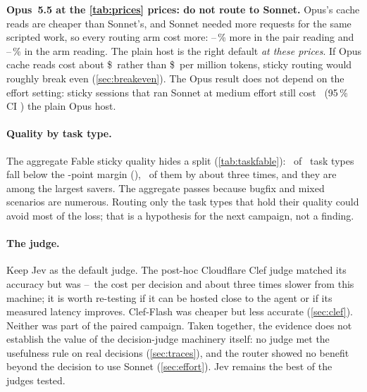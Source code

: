 \begin{keyidea}
\textbf{Opus~5.5 at the \cref{tab:prices} prices: do not route to Sonnet.} Opus's cache reads are cheaper than
Sonnet's, and Sonnet needed more requests for the same scripted work, so every routing arm cost more:
\CfOpusStickyExtra--\CfOpusSonnetExtra\,\% more in the pair reading and
\CfOpusStickyArmExtra--\CfOpusSonnetArmExtra\,\% in the arm reading. The plain host is the right default
\emph{at these prices}. If Opus cache reads cost about \$\BEStickyPair\ rather than \$\PriceOpusRead\ per
million tokens, sticky routing would roughly break even (\cref{sec:breakeven}). The Opus result does not depend on
the effort setting: sticky sessions that ran Sonnet at medium effort still cost \RvEffVsAnchorOpusTwo\X\ (95\,\% CI
\RvEffVsAnchorOpusCI) the plain Opus host.
\end{keyidea}

\paragraph{Quality by task type.} The aggregate Fable sticky quality hides a split (\cref{tab:taskfable}):
\RgNTaskFail\ of \RgNTask\ task types fall below the \NIMarginPts-point margin (\RgTaskFailList), \RgNTaskThreeX\
of them by about three times, and they are among the largest savers. The aggregate passes because bugfix and
mixed scenarios are numerous. Routing only the task types that hold their quality could avoid most of the loss;
that is a hypothesis for the next campaign, not a finding.

\paragraph{The judge.} Keep Jev as the default judge. The post-hoc Cloudflare Clef judge matched its accuracy but
was \ClClefCostXLow--\ClClefCostXHigh\X\ the cost per decision and about three times slower from this machine; it is
worth re-testing if it can be hosted close to the agent or if its measured latency improves. Clef-Flash was cheaper
but less accurate (\cref{sec:clef}). Neither was part of the paired campaign. Taken together, the evidence does not
establish the value of the decision-judge machinery itself: no judge met the usefulness rule on real decisions
(\cref{sec:traces}), and the router showed no benefit beyond the decision to use Sonnet (\cref{sec:effort}). Jev
remains the best of the judges tested.


